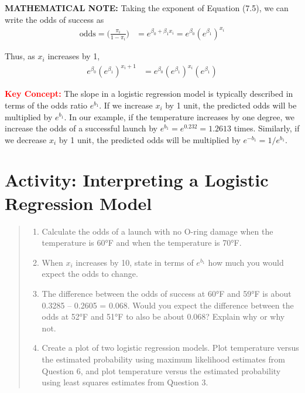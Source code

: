 \documentclass[
]{report}
\providecommand{\tightlist}{%
  \setlength{\itemsep}{0pt}\setlength{\parskip}{0pt}}
\begin{document}
\large

\textbf{MATHEMATICAL NOTE:}
Taking the exponent of Equation (7.5), we can write the odds of success as
\begin{align}
\text{odds} = \biggl(\frac{\pi_i}{1 - \pi_i}\biggr) &= e^{\beta_0 + \beta_1 x_i} = e^{\beta_0}(e^{\beta_1})^{x_i} \tag{7.11}
\end{align}

Thus, as \(x_i\) increases by 1,
\begin{align}
e^{\beta_0}(e^{\beta_1})^{x_i + 1} &= e^{\beta_0}(e^{\beta_1})^{x_i}(e^{\beta_1}) \tag{7.12}
\end{align}

\normalsize

\Large

\textbf{\textcolor{red}{Key Concept:}}
\color{red}
The slope in a logistic regression model is typically described in terms of the odds ratio \(e^{b_1}\). If we increase \(x_i\) by 1 unit, the predicted odds will be multiplied by \(e^{b_1}\). In our example, if the temperature increases by one degree, we increase the odds of a successful launch by \(e^{b_1} = e^{0.232} = 1.2613\) times. Similarly, if we decrease \(x_i\) by 1 unit, the predicted odds will be multiplied by \(e^{-b_1} = 1/e^{b_1}\).
\color{black}
\normalsize

\section*{Activity: Interpreting a Logistic Regression Model}\label{activity-interpreting-a-logistic-regression-model}

\begin{quote}
\begin{enumerate}
\def\labelenumi{\arabic{enumi}.}
\setcounter{enumi}{7}
\tightlist
\item
  Calculate the odds of a launch with no O-ring damage when the temperature is 60°F and when the temperature is 70°F.\\
\item
  When \(x_i\) increases by 10, state in terms of \(e^{b_1}\) how much you would expect the odds to change.\\
\item
  The difference between the odds of success at 60°F and 59°F is about 0.3285 -- 0.2605 = 0.068. Would you expect the difference between the odds at 52°F and 51°F to also be about 0.068? Explain why or why not.\\
\item
  Create a plot of two logistic regression models. Plot temperature versus the estimated probability using maximum likelihood estimates from Question 6, and plot temperature versus the estimated probability using least squares estimates from Question 3.
\end{enumerate}
\end{quote}
\end{document}
